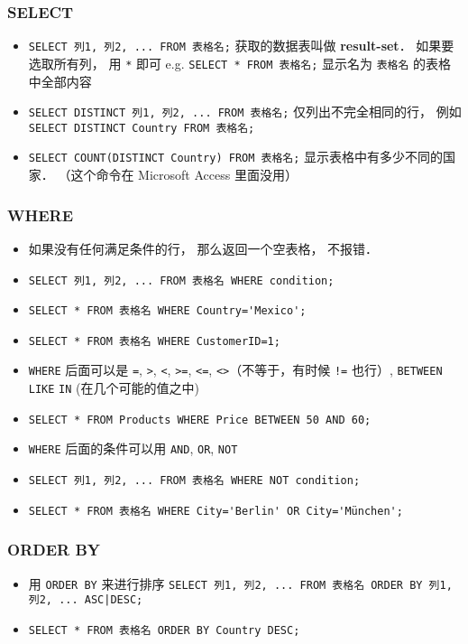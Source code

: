 \subsubsection{SELECT}
\begin{itemize}
\item \verb`SELECT 列1, 列2, ... FROM 表格名;` 获取的数据表叫做 \textbf{result-set}． 如果要选取所有列， 用 \verb`*` 即可 e.g. \verb`SELECT * FROM 表格名;` 显示名为 \verb|表格名| 的表格中全部内容
\item \verb`SELECT DISTINCT 列1, 列2, ... FROM 表格名;` 仅列出不完全相同的行， 例如 \verb`SELECT DISTINCT Country FROM 表格名;`
\item \verb`SELECT COUNT(DISTINCT Country) FROM 表格名;` 显示表格中有多少不同的国家． （这个命令在 Microsoft Access 里面没用）
\end{itemize}

\subsubsection{WHERE}
\begin{itemize}
\item 如果没有任何满足条件的行， 那么返回一个空表格， 不报错．
\item \verb`SELECT 列1, 列2, ... FROM 表格名 WHERE condition;`
\item \verb`SELECT * FROM 表格名 WHERE Country='Mexico';`
\item \verb`SELECT * FROM 表格名 WHERE CustomerID=1;`
\item \verb`WHERE` 后面可以是 \verb`=`, \verb`>`, \verb`<`, \verb`>=`, \verb`<=`, \verb`<>`（不等于，有时候 \verb`!=` 也行）, \verb`BETWEEN` \verb`LIKE` \verb`IN` (在几个可能的值之中)
\item \verb`SELECT * FROM Products WHERE Price BETWEEN 50 AND 60;`
\item \verb`WHERE` 后面的条件可以用 \verb`AND`, \verb`OR`, \verb`NOT`
\item \verb`SELECT 列1, 列2, ... FROM 表格名 WHERE NOT condition;`
\item \verb`SELECT * FROM 表格名 WHERE City='Berlin' OR City='München';`
\end{itemize}

\subsubsection{ORDER BY}
\begin{itemize}
\item 用 \verb`ORDER BY` 来进行排序 \verb`SELECT 列1, 列2, ... FROM 表格名 ORDER BY 列1, 列2, ... ASC|DESC;`
\item \verb`SELECT * FROM 表格名 ORDER BY Country DESC;`
\end{itemize}

